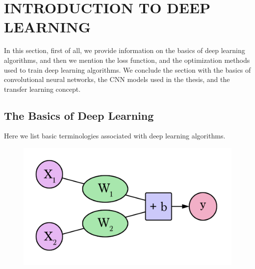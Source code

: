 \chapter{INTRODUCTION TO DEEP LEARNING}
\label{ch:CH3}

In this section, first of all, we provide information on the basics of deep learning algorithms, and then we mention the loss function, and the optimization methods used to train deep learning algorithms. We conclude the section with the basics of convolutional neural networks, the CNN models used in the thesis, and the transfer learning concept.

\section{The Basics of Deep Learning}

Here we list basic terminologies associated with deep learning algorithms.

\begin{figure}[h]
\centering
\includegraphics[width=.8\linewidth]{fig/NNs_2_variables.png}
\label{fig:basic_neuron}
\end{figure}

